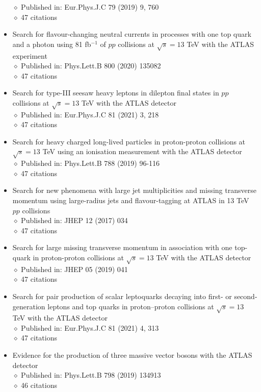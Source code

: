 \documentclass[margin, 10pt]{res} %
\begin{document}
\begin{resume}
\begin{itemize}
$\diamond$ Published in: Eur.Phys.J.C 79 (2019) 9, 760\\
$\diamond$ 47 citations
\item Search for flavour-changing neutral currents in processes with one top quark and a photon using 81 fb$^{-1}$ of $pp$ collisions at $\sqrt{s} = 13$ TeV with the ATLAS experiment\\
$\diamond$ Published in: Phys.Lett.B 800 (2020) 135082\\
$\diamond$ 47 citations
\item Search for type-III seesaw heavy leptons in dilepton final states in $pp$ collisions at $\sqrt{s} = 13$ TeV with the ATLAS detector\\
$\diamond$ Published in: Eur.Phys.J.C 81 (2021) 3, 218\\
$\diamond$ 47 citations
\item Search for heavy charged long-lived particles in proton-proton collisions at $\sqrt{s} = 13$ TeV using an ionisation measurement with the ATLAS detector\\
$\diamond$ Published in: Phys.Lett.B 788 (2019) 96-116\\
$\diamond$ 47 citations
\item Search for new phenomena with large jet multiplicities and missing transverse momentum using large-radius jets and flavour-tagging at ATLAS in 13 TeV $pp$ collisions\\
$\diamond$ Published in: JHEP 12 (2017) 034\\
$\diamond$ 47 citations
\item Search for large missing transverse momentum in association with one top-quark in proton-proton collisions at $\sqrt{s} = 13$ TeV with the ATLAS detector\\
$\diamond$ Published in: JHEP 05 (2019) 041\\
$\diamond$ 47 citations
\item Search for pair production of scalar leptoquarks decaying into first- or second-generation leptons and top quarks in proton–proton collisions at $\sqrt{s} = 13$ TeV with the ATLAS detector\\
$\diamond$ Published in: Eur.Phys.J.C 81 (2021) 4, 313\\
$\diamond$ 47 citations
\item Evidence for the production of three massive vector bosons with the ATLAS detector\\
$\diamond$ Published in: Phys.Lett.B 798 (2019) 134913\\
$\diamond$ 46 citations

\end{itemize}
\end{resume}
\end{document}
